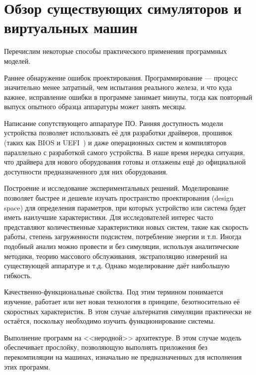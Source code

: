 \chapter{Обзор существующих симуляторов и виртуальных машин}\label{survey}



Перечислим некоторые способы практического применения программных моделей.

\begin{description*}
    
\item[Раннее обнаружение ошибок проектирования.] Программирование --- процесс значительно менее затратный, чем испытания реального железа, и что куда важнее, исправление ошибки в программе занимает минуты, тогда как повторный выпуск опытного образца аппаратуры может занять месяцы. 

\item[Написание сопутствующего аппаратуре ПО.] Ранняя доступность модели устройства позволяет использовать её для разработки драйверов, прошивок (таких как BIOS и UEFI~\cite{uefi-itj}) и даже операционных систем и компиляторов параллельно с разработкой самого устройства. В наше время нередка ситуация, что драйвера для нового оборудования готовы и отлажены ещё до официальной доступности предназначенного для них оборудования.

\item[Построение и исследование экспериментальных решений.] Моделирование позволяет быстрее и дешевле  изучать пространство проектирования (\abbr design space) для определения параметров, при которых устройство или система будет иметь наилучшие характеристики. Для исследователей интерес часто представляют количественные характеристики новых систем, такие как скорость работы, степень загруженности подсистем, потребление энергии и т.п. Иногда подобный анализ можно провести и без симуляции, используя аналитические методики, теорию массового обслуживания, экстраполяцию измерений на существующей аппаратуре и т.д. Однако моделирование даёт наибольшую гибкость.

\item[Качественно-функциональные свойства.] Под этим тер\-ми\-ном понимается изучение, работает или нет новая технология в принципе, безотносительно её скоростных характеристик. В этом случае альтернатив симуляции практически не остаётся, поскольку необходимо изучить функционирование системы.

\item[Выполнение программ на <<неродной>> архитектуре.] В этом случае модель обеспечивает прослойку, позволяющую выполнять приложения без перекомпиляции на машинах, изначально не предназначенных для исполнения этих программ. 

\end{description*}


